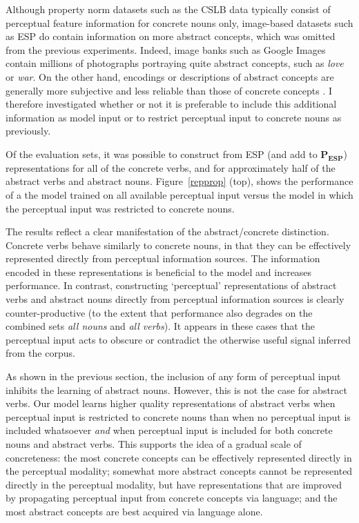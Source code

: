 Although property norm datasets such as the CSLB data typically consist of perceptual feature information for concrete nouns only, image-based datasets such as ESP do contain information on more abstract concepts, which was omitted from the previous experiments. Indeed, image banks such as Google Images contain millions of photographs portraying quite abstract concepts, such as \emph{love} or \emph{war}. On the other hand, encodings or descriptions of abstract concepts are generally more subjective and less reliable than those of concrete concepts \citep{katja2005content}. I therefore investigated whether or not it is preferable to include this additional information as model input or to restrict perceptual input to concrete nouns as previously.    

Of the evaluation sets, it was possible to construct from ESP (and add to \(\mathbf{P_{ESP}}\)) representations for all of the concrete verbs, and for approximately half of the abstract verbs and abstract nouns. Figure~\ref{repprop} (top), shows the performance of a the model trained on all available perceptual input versus the model in which the perceptual input was restricted to concrete nouns. 

The results reflect a clear manifestation of the abstract/concrete distinction. Concrete verbs behave similarly to concrete nouns, in that they can be effectively represented directly from perceptual information sources. The information encoded in these representations is beneficial to the model and increases performance. In contrast, constructing `perceptual' representations of abstract verbs and abstract nouns directly from perceptual information sources is clearly counter-productive (to the extent that performance also degrades on the combined sets \emph{all nouns} and \emph{all verbs}). It appears in these cases that the perceptual input acts to obscure or contradict the otherwise useful signal inferred from the corpus.

As shown in the previous section, the inclusion of any form of perceptual input inhibits the learning of abstract nouns. However, this is not the case for abstract verbs. Our model learns higher quality representations of abstract verbs when perceptual input is restricted to concrete nouns than when no perceptual input is included whatsoever \emph{and} when perceptual input is included for both concrete nouns and abstract verbs. This supports the idea of a gradual scale of concreteness: the most concrete concepts can be effectively represented directly in the perceptual modality; somewhat more abstract concepts cannot be represented directly in the perceptual modality, but have representations that are improved by propagating perceptual input from concrete concepts via language; and the most abstract concepts are best acquired via language alone.   

